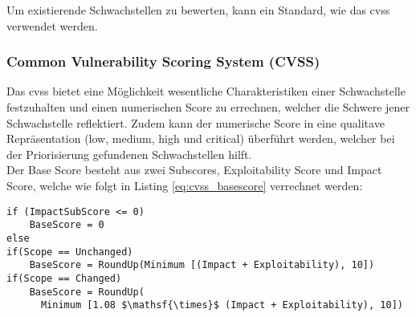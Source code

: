 	\noindent Um existierende Schwachstellen zu bewerten, kann ein Standard, wie das \gls{cvss} verwendet werden.
	
\subsubsection{Common Vulnerability Scoring System (CVSS)}
\label{sec:sota_sa_cvss}
    Das \gls{cvss} bietet eine Möglichkeit wesentliche Charakteristiken einer Schwachstelle festzuhalten und einen numerischen Score zu errechnen, welcher die Schwere jener Schwachstelle reflektiert. 
    Zudem kann der numerische Score in eine qualitave Repräsentation (low, medium, high und critical) überführt werden, welcher bei der Priorisierung gefundenen Schwachstellen hilft.\cite{CVSSspec}
    \medskip\\
    Der Base Score besteht aus zwei Subscores, Exploitability Score und Impact Score, welche wie folgt in Listing \ref{eq:cvss_basescore} verrechnet werden:
    \begin{lstlisting}[caption={Berechnung des BaseScore \cite{CVSSspec}},label=eq:cvss_basescore,captionpos=b,mathescape=true]
if (ImpactSubScore <= 0)
    BaseScore = 0
else
if(Scope == Unchanged)
    BaseScore = RoundUp(Minimum [(Impact + Exploitability), 10])
if(Scope == Changed)
    BaseScore = RoundUp(
      Minimum [1.08 $\mathsf{\times}$ (Impact + Exploitability), 10])
    \end{lstlisting}
    
